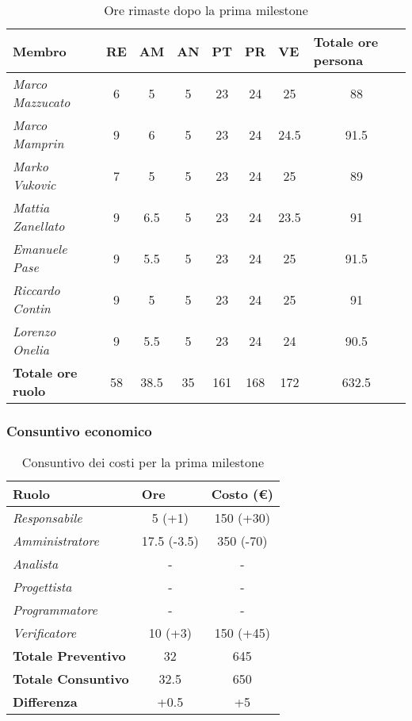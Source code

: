 \begin{table}[!ht]
    \centering
    \begin{tabular}{|l|c|c|c|c|c|c|c|}
    \hline
    \textbf{Membro} & \multicolumn{1}{l|}{\textbf{RE}} & \multicolumn{1}{l|}{\textbf{AM}} & \multicolumn{1}{l|}{\textbf{AN}} & \multicolumn{1}{l|}{\textbf{PT}} & \multicolumn{1}{l|}{\textbf{PR}} & \multicolumn{1}{l|}{\textbf{VE}} & \multicolumn{1}{l|}{\textbf{Totale ore persona}} \\ \hline
    \textit{Marco Mazzucato}  & 6  & 5   & 5  & 23  & 24 & 25   & 88   \\ \hline
    \textit{Marco Mamprin}    & 9  & 6   & 5  & 23  & 24 & 24.5 & 91.5 \\ \hline
    \textit{Marko Vukovic}    & 7  & 5   & 5  & 23  & 24 & 25   & 89   \\ \hline
    \textit{Mattia Zanellato} & 9  & 6.5 & 5  & 23  & 24 & 23.5 & 91   \\ \hline
    \textit{Emanuele Pase}    & 9  & 5.5 & 5  & 23  & 24 & 25   & 91.5 \\ \hline
    \textit{Riccardo Contin}  & 9  & 5   & 5  & 23  & 24 & 25   & 91   \\ \hline
    \textit{Lorenzo Onelia}   & 9  & 5.5 & 5  & 23  & 24 & 24   & 90.5 \\ \hline
    \textbf{Totale ore ruolo} & 58 & 38.5& 35 & 161 & 168& 172  & 632.5\\ \hline
    \end{tabular}
    \caption{Ore rimaste dopo la prima milestone}
\end{table}

\subsubsection{Consuntivo economico}

\begin{table}[!ht]
    \centering
    \begin{tabular}{|l|c|c|}
    \hline
    \textbf{Ruolo} & \multicolumn{1}{l|}{\textbf{Ore}} & \multicolumn{1}{l|}{\textbf{Costo (€)}} \\ \hline
    \textit{Responsabile}      & 5 (+1)    & 150 (+30) \\ \hline
    \textit{Amministratore}    & 17.5 (-3.5) & 350 (-70) \\ \hline
    \textit{Analista}          & -         & -         \\ \hline
    \textit{Progettista}       & -         & -         \\ \hline
    \textit{Programmatore}     & -         & -         \\ \hline
    \textit{Verificatore}      & 10 (+3)    & 150 (+45) \\ \hline
    \textbf{Totale Preventivo} & 32        & 645       \\ \hline
    \textbf{Totale Consuntivo} & 32.5      & 650       \\ \hline
    \textbf{Differenza}        & +0.5      & +5       \\ \hline
    \end{tabular}
    \caption{Consuntivo dei costi per la prima milestone}
\end{table}

